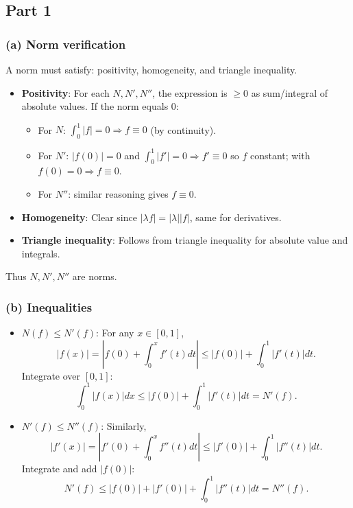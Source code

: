 \documentclass[12pt]{article}
\begin{document}
\begin{answerbox}
\subsection*{Part 1}

\subsubsection*{(a) Norm verification}
A norm must satisfy: positivity, homogeneity, and triangle inequality.

\begin{itemize}
    \item \textbf{Positivity}: For each \(N, N', N''\), the expression is \(\geq 0\) as sum/integral of absolute values. If the norm equals 0:
        \begin{itemize}
            \item For \(N\): \(\int_0^1 |f| = 0 \Rightarrow f \equiv 0\) (by continuity).
            \item For \(N'\): \(|f(0)| = 0\) and \(\int_0^1 |f'| = 0 \Rightarrow f' \equiv 0\) so \(f\) constant; with \(f(0)=0 \Rightarrow f \equiv 0\).
            \item For \(N''\): similar reasoning gives \(f \equiv 0\).
        \end{itemize}
    \item \textbf{Homogeneity}: Clear since \(|\lambda f| = |\lambda||f|\), same for derivatives.
    \item \textbf{Triangle inequality}: Follows from triangle inequality for absolute value and integrals.
\end{itemize}
Thus \(N, N', N''\) are norms.

\subsubsection*{(b) Inequalities}
\begin{itemize}
    \item \(N(f) \leq N'(f)\): For any \(x\in[0,1]\),
    \[
    |f(x)| = \left| f(0) + \int_0^x f'(t)dt \right| \leq |f(0)| + \int_0^1 |f'(t)|dt.
    \]
    Integrate over \([0,1]\):
    \[
    \int_0^1 |f(x)|dx \leq |f(0)| + \int_0^1 |f'(t)|dt = N'(f).
    \]
    
    \item \(N'(f) \leq N''(f)\): Similarly,
    \[
    |f'(x)| = \left| f'(0) + \int_0^x f''(t)dt \right| \leq |f'(0)| + \int_0^1 |f''(t)|dt.
    \]
    Integrate and add \(|f(0)|\):
    \[
    N'(f) \leq |f(0)| + |f'(0)| + \int_0^1 |f''(t)|dt = N''(f).
    \]
\end{itemize}


\end{answerbox}
\end{document}
